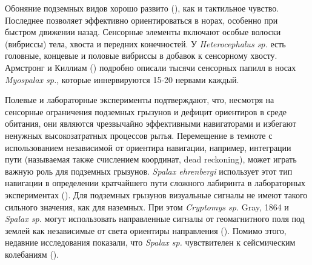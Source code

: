
Обоняние подземных видов хорошо развито (\cite{REICHMAN1990}), как и тактильное чувство. Последнее позволяет эффективно ориентироваться в норах, особенно при быстром движении назад. Сенсорные элементы включают особые волоски (вибриссы) тела, хвоста и передних конечностей. У \textit{Heterocephalus sp.} есть головные, концевые и половые вибриссы в добавок к сенсорному хвосту. Армстронг и Киллиам (\cite{ARMSTRONG1961}) подробно описали тысячи сенсорных папилл в носах \textit{Myospalax sp.}, которые иннервируются 15-20 нервами каждый. 

Полевые и лабораторные эксперименты подтверждают, что, несмотря на сенсорные ограничения подземных грызунов и дефицит ориентиров в среде обитания, они являются чрезвычайно эффективными навигаторами и избегают ненужных высокозатратных процессов рытья. Перемещение в темноте с использованием независимой от ориентира навигации, например, интеграции пути (называемая также счислением координат, dead reckoning), может играть важную роль для подземных грызунов. \textit{Spalax ehrenbergi} использует этот тип навигации в определении кратчайшего пути сложного лабиринта в лабораторных экспериментах (\cite{Kimchi2004}). Для подземных грызунов визуальные сигналы не имеют такого сильного значения, как для наземных. При этом \textit{Cryptomys sp.} Gray, 1864 и \textit{Spalax sp.} могут использовать направленные сигналы от геомагнитного поля под землей как независимые от света ориентиры направления (\cite{Kimchi2004}). Помимо этого, недавние исследования показали, что \textit{Spalax sp.} чувствителен к сейсмическим колебаниям (\cite{Heth1987}).



